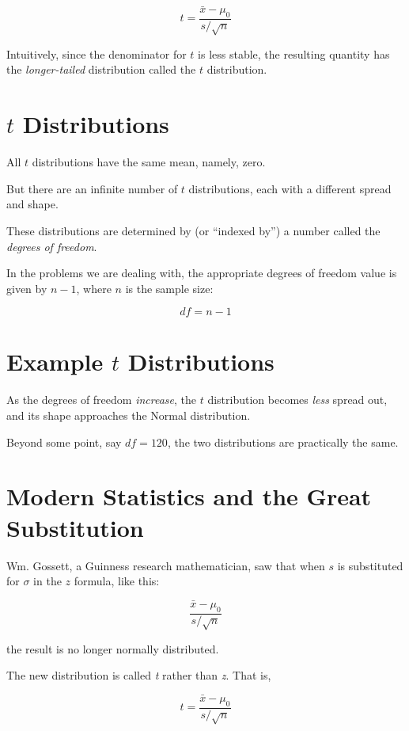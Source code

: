 \documentclass[
  letterpaper,
  DIV=11,
  numbers=noendperiod]{scrreprt}
\begin{document}
\[
t = \frac{\bar{x} - \mu_0}{s/\sqrt{n}}
\]

Intuitively, since the denominator for \(t\) is less stable, the
resulting quantity has the \emph{longer-tailed} distribution called the
\(t\) distribution.

\section{\texorpdfstring{\(t\)
Distributions}{t Distributions}}\label{t-distributions}

All \(t\) distributions have the same mean, namely, zero.

But there are an infinite number of \(t\) distributions, each with a
different spread and shape.

These distributions are determined by (or ``indexed by'') a number
called the \emph{degrees of freedom}.

In the problems we are dealing with, the appropriate degrees of freedom
value is given by \(n - 1\), where \(n\) is the sample size:

\[
df = n - 1
\]

\section{\texorpdfstring{Example \(t\)
Distributions}{Example t Distributions}}\label{example-t-distributions}

As the degrees of freedom \emph{increase}, the \(t\) distribution
becomes \emph{less} spread out, and its shape approaches the Normal
distribution.

Beyond some point, say \(df = 120\), the two distributions are
practically the same.

\section{Modern Statistics and the Great
Substitution}\label{modern-statistics-and-the-great-substitution-1}

Wm. Gossett, a Guinness research mathematician, saw that when \(s\) is
substituted for \(\sigma\) in the \(z\) formula, like this:

\[
\frac{\bar{x} - \mu_0}{s/\sqrt{n}}
\]

the result is no longer normally distributed.

The new distribution is called \emph{t} rather than \emph{z}. That is,

\[
t = \frac{\bar{x} - \mu_0}{s/\sqrt{n}}
\]
\end{document}
